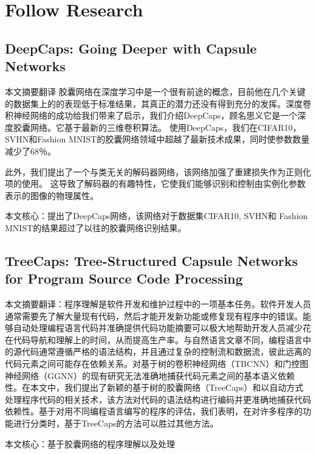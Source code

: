 \section{Follow Research}
\subsection{DeepCaps: Going Deeper with Capsule Networks}
本文摘要翻译\cite{rajasegaran2019deepcaps}
胶囊网络在深度学习中是一个很有前途的概念，目前他在几个关键的数据集上的的表现低于标准结果，其真正的潜力还没有得到充分的发挥。深度卷积神经网络的成功给我们带来了启示，我们介绍DeepCaps，顾名思义它是一个深度胶囊网络。它基于最新的三维卷积算法。 使用DeepCaps，我们在CIFAR10，SVHN和Fashion MNIST的胶囊网络领域中超越了最新技术成果，同时使参数数量减少了68％。

此外，我们提出了一个与类无关的解码器网络，该网络加强了重建损失作为正则化项的使用。 这导致了解码器的有趣特性，它使我们能够识别和控制由实例化参数表示的图像的物理属性。

本文核心：提出了DeepCaps网络，该网络对于数据集CIFAR10, SVHN和 Fashion MNIST的结果超过了以往的胶囊网络识别结果。

\subsection{TreeCaps: Tree-Structured Capsule Networks for Program Source Code Processing}
本文摘要翻译\cite{jayasundara2019treecaps}：程序理解是软件开发和维护过程中的一项基本任务。软件开发人员通常需要先了解大量现有代码，然后才能开发新功能或修复现有程序中的错误。能够自动处理编程语言代码并准确提供代码功能摘要可以极大地帮助开发人员减少花在代码导航和理解上的时间，从而提高生产率。与自然语言文章不同，编程语言中的源代码通常遵循严格的语法结构，并且通过复杂的控制流和数据流，彼此远离的代码元素之间可能存在依赖关系。对基于树的卷积神经网络（TBCNN）和门控图神经网络（GGNN）的现有研究无法准确地捕获代码元素之间的基本语义依赖性。在本文中，我们提出了新颖的基于树的胶囊网络（TreeCaps）和以自动方式处理程序代码的相关技术，该方法对代码的语法结构进行编码并更准确地捕获代码依赖性。基于对用不同编程语言编写的程序的评估，我们表明，在对许多程序的功能进行分类时，基于TreeCaps的方法可以胜过其他方法。

本文核心：基于胶囊网络的程序理解以及处理